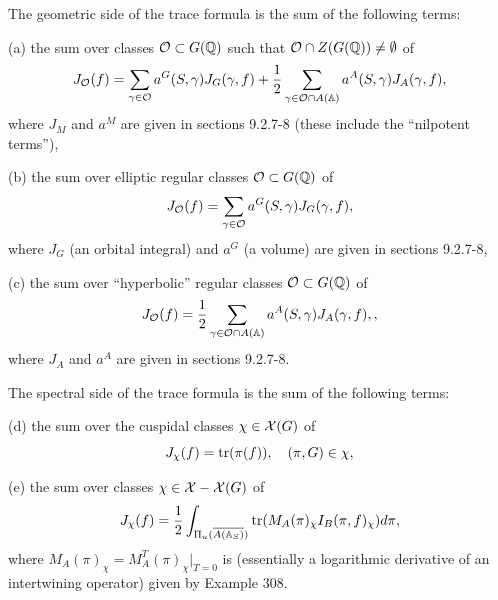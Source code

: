 The geometric side of the trace formula is the sum of the following terms:

(a) the sum over classes ${\cal{O}}\subset G({\Bbb{Q}})$
such that ${\cal{O}}\cap Z(G({\Bbb{Q}}))\not= \emptyset$ of
\begin{equation}
J_{\cal{O}}(f)=
\sum_{\gamma\in {\cal O}}
a^G(S,\gamma)J_G(\gamma,f)+{1\over 2}
\sum_{\gamma\in {\cal O}\cap A({\mathbb A})}
a^A(S,\gamma)J_A(\gamma,f),
\end{equation}
where $J_M$ and $a^M$ are given in sections 9.2.7-8
(these include the ``nilpotent terms''),

(b) the sum over elliptic regular classes ${\cal{O}}\subset G({\Bbb{Q}})$
of
\begin{equation}
J_{\cal{O}}(f)=
\sum_{\gamma\in {\cal O}}
a^G(S,\gamma)J_G(\gamma,f),
\end{equation}
where $J_G$ (an orbital integral) and $a^G$ (a volume)
are given in sections 9.2.7-8,

(c) the sum over ``hyperbolic'' regular classes
${\cal{O}}\subset G({\Bbb{Q}})$
of
\begin{equation}
J_{\cal{O}}(f)=
{1\over 2}\sum_{\gamma\in {\cal O}\cap A({\mathbb A})}
a^A(S,\gamma)J_A(\gamma,f),,
\end{equation}
where $J_A$ and $a^A$ are given in sections 9.2.7-8.

The spectral side of the trace formula is the sum of the following terms:

(d) the sum over the cuspidal classes $\chi\in {\cal{X}}(G)$ of
\begin{equation}
J_\chi(f)=
{\rm tr}(\pi(f)),\ \ \ (\pi,G)\in\chi,
\end{equation}

(e) the sum over classes $\chi\in {\cal{X}}-{\cal{X}}(G)$ of
\begin{equation}
J_\chi(f)=
{1\over 2}\int_{\Pi_u(\overline{A({\Bbb{A}}_S)})}
{\rm tr}(M_A(\pi)_\chi I_B(\pi,f)_\chi)d\pi,
\end{equation}
where $M_A(\pi)_\chi =M_A^T(\pi)_\chi|_{T=0}$ is
(essentially a logarithmic derivative of an intertwining operator)
given by Example 308.


